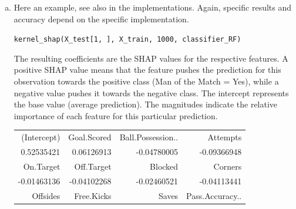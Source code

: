 {\begin{enumerate}[a)]
	Pseudocode of \texttt{kernel\_shap()}
	
	\begin{algorithm}[H]
		\caption{\texttt{kernel\_shap()}}
		\begin{algorithmic}[1]
			\Require \texttt{obs}: observation
			\Require \texttt{X}: feature matrix
			\Require \texttt{nr\_samples}: number of samples
			\Require \texttt{predict}: prediction model
			\State \texttt{mask, pred, weight} $\gets$ \texttt{shap\_data(obs, X, nr\_samples, predict)}
			\State \texttt{lm} $\gets$ weighted linear regression model using \texttt{mask, pred} and \texttt{weight}
			\State \textbf{return} coefficients and intercept of \texttt{lm}
		\end{algorithmic}
	\end{algorithm}

    \textit{Note:} This simplified implementation uses unconstrained weighted least squares. The original KernelSHAP algorithm enforces the efficiency constraint $\phi_0 = \E[\fh(\Xv)]$ and $\sum_j \phi_j = \fh(\xv) - \phi_0$ via infinite weights on the empty and full coalitions. Our sampling-based version may not exactly satisfy this property.

	\item
    Here an example, see also in the implementations. Again, specific results and accuracy depend on the specific implementation.

    \texttt{kernel\_shap(X\_test[1, ], X\_train, 1000, classifier\_RF)}

    The resulting coefficients are the SHAP values for the respective features. A positive SHAP value means that the feature pushes the prediction for this observation towards the positive class (Man of the Match = Yes), while a negative value pushes it towards the negative class. The intercept represents the base value (average prediction). The magnitudes indicate the relative importance of each feature for this particular prediction.
	\begin{table}[H]
		\centering
		\begin{tabular}{rrrr}
			\hline 
			(Intercept) &Goal.Scored & Ball.Possession..  & Attempts \\

			0.52535421 & 0.06126913 & -0.04780005 & -0.09366948  \\
			\hline
			On.Target& Off.Target & Blocked &  Corners  \\

			-0.01463136 & -0.04102268 & -0.02460521 & -0.04113441  \\
			\hline
			Offsides & Free.Kicks & Saves & Pass.Accuracy..  \\


\end{tabular}
\end{table}
\end{enumerate}}
